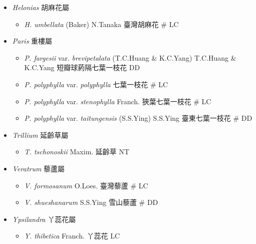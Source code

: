 
  \begin{itemize}
 \item[] \textit{Helonias} 胡麻花屬
                                
  \begin{itemize}
        \item[] \textit{H. umbellata} (Baker) N.Tanaka  臺灣胡麻花  \# LC
  \end{itemize}
 \item[] \textit{Paris} 重樓屬
                                
  \begin{itemize}
        \item[] \textit{P. fargesii} var. \textit{brevipetalata} (T.C.Huang \& K.C.Yang) T.C.Huang \& K.C.Yang  短瓣球葯隔七葉一枝花   DD
        \item[] \textit{P. polyphylla} var. \textit{polyphylla}   七葉一枝花  \# LC
        \item[] \textit{P. polyphylla} var. \textit{stenophylla} Franch.  狹葉七葉一枝花  \# LC
        \item[] \textit{P. polyphylla} var. \textit{taitungensis} (S.S.Ying) S.S.Ying  臺東七葉一枝花  \# DD
  \end{itemize}
 \item[] \textit{Trillium} 延齡草屬
                                
  \begin{itemize}
        \item[] \textit{T. tschonoskii} Maxim.  延齡草   NT
  \end{itemize}
 \item[] \textit{Veratrum} 藜蘆屬
                                
  \begin{itemize}
        \item[] \textit{V. formosanum} O.Loes.  臺灣藜蘆  \# LC
        \item[] \textit{V. shueshanarum} S.S.Ying  雪山藜蘆  \# DD
  \end{itemize}
 \item[] \textit{Ypsilandra} 丫蕊花屬
                                
  \begin{itemize}
        \item[] \textit{Y. thibetica} Franch.  丫蕊花   LC
  \end{itemize}
  \end{itemize}
